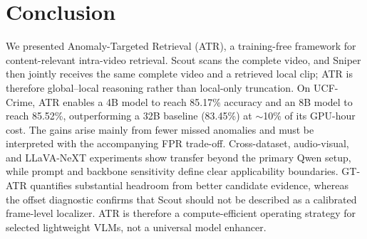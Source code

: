 \section{Conclusion}
\label{sec:conclusion}

We presented Anomaly-Targeted Retrieval (ATR), a training-free framework for content-relevant intra-video retrieval. Scout scans the complete video, and Sniper then jointly receives the same complete video and a retrieved local clip; ATR is therefore global--local reasoning rather than local-only truncation. On UCF-Crime, ATR enables a 4B model to reach 85.17\% accuracy and an 8B model to reach 85.52\%, outperforming a 32B baseline (83.45\%) at $\sim$10\% of its GPU-hour cost. The gains arise mainly from fewer missed anomalies and must be interpreted with the accompanying FPR trade-off. Cross-dataset, audio-visual, and LLaVA-NeXT experiments show transfer beyond the primary Qwen setup, while prompt and backbone sensitivity define clear applicability boundaries. GT-ATR quantifies substantial headroom from better candidate evidence, whereas the offset diagnostic confirms that Scout should not be described as a calibrated frame-level localizer. ATR is therefore a compute-efficient operating strategy for selected lightweight VLMs, not a universal model enhancer.




